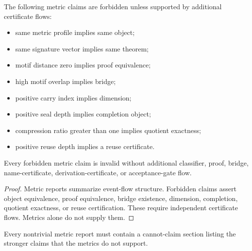 \begin{definition}
\label{def:metric-report-forbidden-claim}
The following metric claims are forbidden unless supported by additional certificate flows:
\begin{itemize}
\item same metric profile implies same object;
\item same signature vector implies same theorem;
\item motif distance zero implies proof equivalence;
\item high motif overlap implies bridge;
\item positive carry index implies dimension;
\item positive seal depth implies completion object;
\item compression ratio greater than one implies quotient exactness;
\item positive reuse depth implies a reuse certificate.
\end{itemize}
\end{definition}

\begin{theorem}
\label{thm:metric-report-forbidden-claims-need-certificates}
Every forbidden metric claim is invalid without additional classifier, proof, bridge, name-certificate, derivation-certificate, or acceptance-gate flow.
\end{theorem}

\begin{proof}
Metric reports summarize event-flow structure. Forbidden claims assert object equivalence, proof equivalence, bridge existence, dimension, completion, quotient exactness, or reuse certification. These require independent certificate flows. Metrics alone do not supply them.
\end{proof}

\begin{corollary}
\label{cor:metric-report-require-cannot-claims}
Every nontrivial metric report must contain a cannot-claim section listing the stronger claims that the metrics do not support.
\end{corollary}

